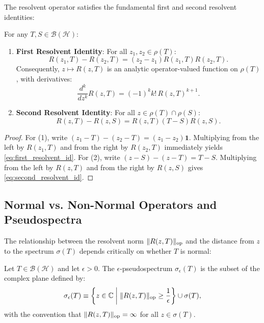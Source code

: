 The resolvent operator satisfies the fundamental first and second resolvent identities:
\begin{proposition}
\label{prop:resolvent_identities}
For any $T, S \in \mathcal{B}(\mathcal{H})$:
\begin{enumerate}
    \item \textbf{First Resolvent Identity}: For all $z_1, z_2 \in \rho(T)$:
    \begin{equation}
    \label{eq:first_resolvent_id}
    R(z_1, T) - R(z_2, T) = (z_2 - z_1) R(z_1, T) R(z_2, T).
    \end{equation}
    Consequently, $z \mapsto R(z, T)$ is an analytic operator-valued function on $\rho(T)$, with derivatives:
    \begin{equation}
    \frac{d^k}{dz^k} R(z, T) = (-1)^k k! \, R(z, T)^{k+1}.
    \end{equation}
    \item \textbf{Second Resolvent Identity}: For all $z \in \rho(T) \cap \rho(S)$:
    \begin{equation}
    \label{eq:second_resolvent_id}
    R(z, T) - R(z, S) = R(z, T) (T - S) R(z, S).
    \end{equation}
\end{enumerate}
\end{proposition}

\begin{proof}
For (1), write $(z_1 - T) - (z_2 - T) = (z_1 - z_2) \mathbf{1}$. Multiplying from the left by $R(z_1, T)$ and from the right by $R(z_2, T)$ immediately yields \eqref{eq:first_resolvent_id}. For (2), write $(z - S) - (z - T) = T - S$. Multiplying from the left by $R(z, T)$ and from the right by $R(z, S)$ gives \eqref{eq:second_resolvent_id}.
\end{proof}

\subsection{Normal vs. Non-Normal Operators and Pseudospectra}
\label{subsec:pseudospectra_theory}

The relationship between the resolvent norm $\|R(z, T)\|_{\mathrm{op}}$ and the distance from $z$ to the spectrum $\sigma(T)$ depends critically on whether $T$ is normal:

\begin{definition}
\label{def:pseudospectrum}
Let $T \in \mathcal{B}(\mathcal{H})$ and let $\epsilon > 0$. The $\epsilon$-pseudospectrum $\sigma_\epsilon(T)$ is the subset of the complex plane defined by:
\begin{equation}
\label{eq:pseudospectrum_def}
\sigma_\epsilon(T) \equiv \left\{ z \in \mathbb{C} \;\middle|\; \|R(z, T)\|_{\mathrm{op}} \ge \frac{1}{\epsilon} \right\} \cup \sigma(T),
\end{equation}
with the convention that $\|R(z, T)\|_{\mathrm{op}} = \infty$ for all $z \in \sigma(T)$.
\end{definition}

